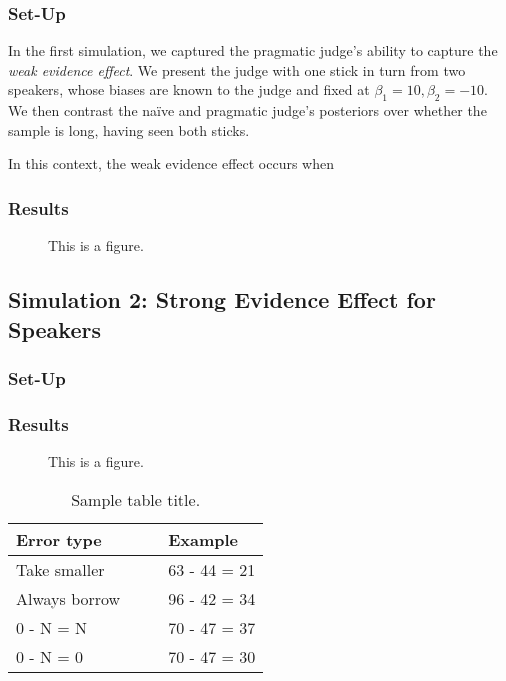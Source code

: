 \documentclass[10pt,letterpaper]{article}
\begin{document}
\subsubsection{Set-Up}
In the first simulation, we captured the pragmatic judge's ability to capture the \textit{weak evidence effect}. We 
present the judge with one stick in turn from two speakers, whose biases are known to the judge and fixed at
$\beta_1 = 10, \beta_2 = -10$. We then contrast the na\"ive and pragmatic judge's posteriors over whether the
sample is long, having seen both sticks.

In this context, the weak evidence effect occurs when 

\subsubsection{Results}

\begin{figure}[H]
\begin{center}
\end{center}
\caption{This is a figure.} 
\label{wee}
\end{figure}

\subsection{Simulation 2: Strong Evidence Effect for Speakers}
\subsubsection{Set-Up}
\subsubsection{Results}

\begin{figure}[H]
\begin{center}
\end{center}
\caption{This is a figure.} 
\label{seeSpeaker}
\end{figure}

\begin{table}[H]
\begin{center} 
\caption{Sample table title.} 
\label{seeSpeakerTable} 
\vskip 0.12in
\begin{tabular}{ll} 
\hline
Error type    &  Example \\
\hline
Take smaller        &   63 - 44 = 21 \\
Always borrow~~~~   &   96 - 42 = 34 \\
0 - N = N           &   70 - 47 = 37 \\
0 - N = 0           &   70 - 47 = 30 \\
\hline
\end{tabular} 
\end{center} 
\end{table}
\end{document}
